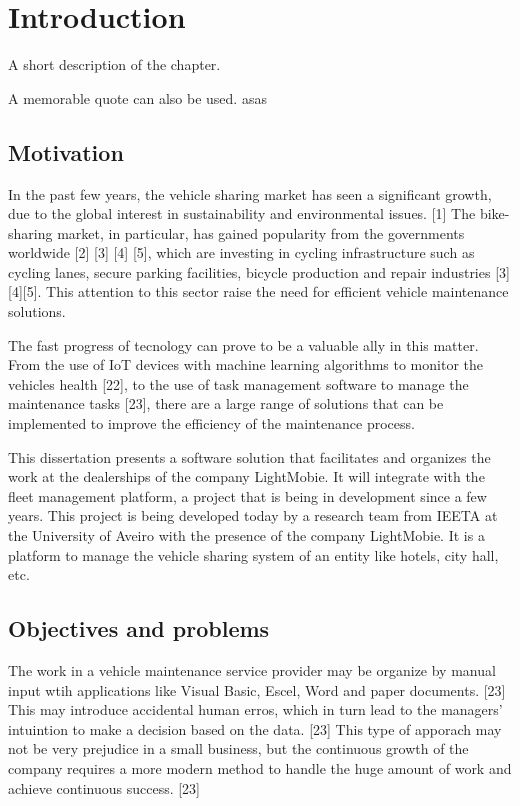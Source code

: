 \chapter{Introduction}%
\label{chapter:introduction}

\begin{introduction}
A short description of the chapter.

A memorable quote can also be used. asas
\end{introduction} 


\section{Motivation}

In the past few years, the vehicle sharing market has seen a significant growth, due to the global interest in sustainability and environmental issues. [1]
The bike-sharing market, in particular, has gained popularity from the governments worldwide [2] [3] [4] [5], which are investing in cycling infrastructure such as cycling lanes, secure parking facilities, bicycle production and repair industries [3][4][5].
This attention to this sector raise the need for efficient vehicle maintenance solutions.

The fast progress of tecnology can prove to be a valuable ally in this matter. 
From the use of IoT devices with machine learning algorithms to monitor the vehicles health [22], 
to the use of task management software to manage the maintenance tasks [23], 
there are a large range of solutions that can be implemented to improve the efficiency of the maintenance process.

This dissertation presents a software solution that facilitates and organizes the work at the dealerships of the company LightMobie. 
It will integrate with the fleet management platform, a project that is being in development since a few years. 
This project is being developed today by a research team from  \ac{IEETA} at the University of Aveiro with the presence of the company LightMobie.
It is a platform to manage the vehicle sharing system of an entity like hotels, city hall, etc.  

\section{Objectives and problems}

The work in a vehicle maintenance service provider may be organize by manual input wtih applications like Visual Basic, Escel, Word and paper documents. [23] 
This may introduce accidental human erros, which in turn lead to the managers' intuintion to make a decision based on the data. [23]
This type of apporach may not be very prejudice in a small business, but the continuous growth of the company requires a more modern method to handle the huge amount of work and achieve continuous success. [23]

